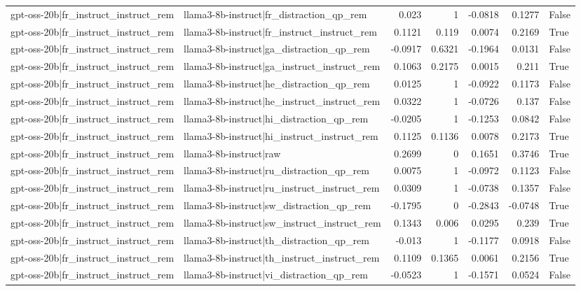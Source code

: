 \begin{table}
\begin{tabular}{l l r r r r l}
gpt-oss-20b|fr_instruct_instruct_rem & llama3-8b-instruct|fr_distraction_qp_rem & 0.023 & 1 & -0.0818 & 0.1277 & False \\
gpt-oss-20b|fr_instruct_instruct_rem & llama3-8b-instruct|fr_instruct_instruct_rem & 0.1121 & 0.119 & 0.0074 & 0.2169 & True \\
gpt-oss-20b|fr_instruct_instruct_rem & llama3-8b-instruct|ga_distraction_qp_rem & -0.0917 & 0.6321 & -0.1964 & 0.0131 & False \\
gpt-oss-20b|fr_instruct_instruct_rem & llama3-8b-instruct|ga_instruct_instruct_rem & 0.1063 & 0.2175 & 0.0015 & 0.211 & True \\
gpt-oss-20b|fr_instruct_instruct_rem & llama3-8b-instruct|he_distraction_qp_rem & 0.0125 & 1 & -0.0922 & 0.1173 & False \\
gpt-oss-20b|fr_instruct_instruct_rem & llama3-8b-instruct|he_instruct_instruct_rem & 0.0322 & 1 & -0.0726 & 0.137 & False \\
gpt-oss-20b|fr_instruct_instruct_rem & llama3-8b-instruct|hi_distraction_qp_rem & -0.0205 & 1 & -0.1253 & 0.0842 & False \\
gpt-oss-20b|fr_instruct_instruct_rem & llama3-8b-instruct|hi_instruct_instruct_rem & 0.1125 & 0.1136 & 0.0078 & 0.2173 & True \\
gpt-oss-20b|fr_instruct_instruct_rem & llama3-8b-instruct|raw & 0.2699 & 0 & 0.1651 & 0.3746 & True \\
gpt-oss-20b|fr_instruct_instruct_rem & llama3-8b-instruct|ru_distraction_qp_rem & 0.0075 & 1 & -0.0972 & 0.1123 & False \\
gpt-oss-20b|fr_instruct_instruct_rem & llama3-8b-instruct|ru_instruct_instruct_rem & 0.0309 & 1 & -0.0738 & 0.1357 & False \\
gpt-oss-20b|fr_instruct_instruct_rem & llama3-8b-instruct|sw_distraction_qp_rem & -0.1795 & 0 & -0.2843 & -0.0748 & True \\
gpt-oss-20b|fr_instruct_instruct_rem & llama3-8b-instruct|sw_instruct_instruct_rem & 0.1343 & 0.006 & 0.0295 & 0.239 & True \\
gpt-oss-20b|fr_instruct_instruct_rem & llama3-8b-instruct|th_distraction_qp_rem & -0.013 & 1 & -0.1177 & 0.0918 & False \\
gpt-oss-20b|fr_instruct_instruct_rem & llama3-8b-instruct|th_instruct_instruct_rem & 0.1109 & 0.1365 & 0.0061 & 0.2156 & True \\
gpt-oss-20b|fr_instruct_instruct_rem & llama3-8b-instruct|vi_distraction_qp_rem & -0.0523 & 1 & -0.1571 & 0.0524 & False \\

\end{tabular}
\end{table}
